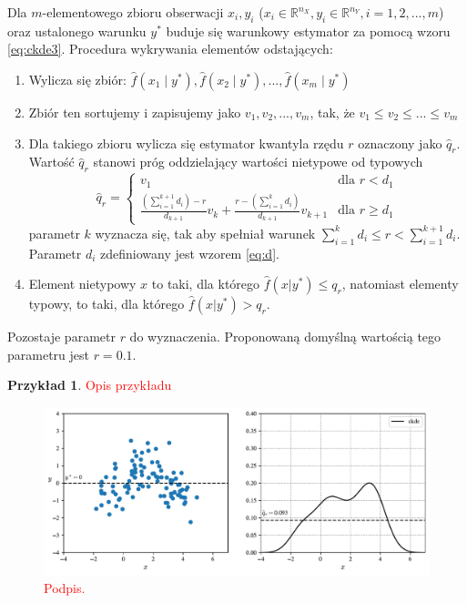 \documentclass[12pt,a4paper,oneside]{book}
\theoremstyle{definition}
\newtheorem{exmp}{Przykład}[chapter]
\begin{document}
Dla $m$-elementowego zbioru obserwacji $x_i, y_i$ ($x_i \in \mathbb{R}^{n_X}, y_i \in \mathbb{R}^{n_Y}, i=1,2,...,m$) oraz ustalonego warunku $y^*$ buduje się warunkowy estymator za pomocą wzoru \eqref{eq:ckde3}. Procedura wykrywania elementów odstających:
\begin{enumerate}
\item Wylicza się zbiór: $\hat{f}(x_1 \mid y^*),\hat{f}(x_2 \mid y^*),...,\hat{f}(x_m \mid y^*)$
\item Zbiór ten sortujemy i zapisujemy jako $v_1,v_2,...,v_m$, tak, że $v_1 \leq v_2 \leq ... \leq v_m$
\item Dla takiego zbioru wylicza się estymator kwantyla rzędu $r$ oznaczony jako $\hat{q}_r$. Wartość $\hat{q}_r$ stanowi próg oddzielający wartości nietypowe od typowych
\begin{equation}
\hat{q}_r =
  \begin{cases}
    v_1 & \text{dla } r < d_1 \\
    \frac{\left( \sum_{i=1}^{k+1} d_i \right) - r}{d_{k+1}} v_k + \frac{r - \left( \sum_{i=1}^k d_i \right)}{d_{k+1}} v_{k+1} & \text{dla } r \geq d_1
  \end{cases}       
\end{equation}
parametr $k$ wyznacza się, tak aby spełniał warunek $\sum_{i=1}^k d_i \leq r < \sum_{i=1}^{k+1} d_i$. Parametr $d_i$ zdefiniowany jest wzorem \eqref{eq:d}.
\item Element nietypowy $x$ to taki, dla którego $\hat{f}(x | y^*) \leq q_r$, natomiast elementy typowy, to taki, dla którego $\hat{f}(x | y^*) > q_r$.
\end{enumerate}
Pozostaje parametr $r$ do wyznaczenia. Proponowaną domyślną wartością tego parametru jest $r=0.1$.
\begin{exmp}
\textcolor{red}{Opis przykładu}
\begin{figure}[H]
    \centering
    \includegraphics[scale=0.6]{ckde_outliers_detector_construction}
    \caption{\textcolor{red}{Podpis.}}
    \label{fig:ckde_outliers_detector_construction}
\end{figure}
\end{exmp}
\end{document}
